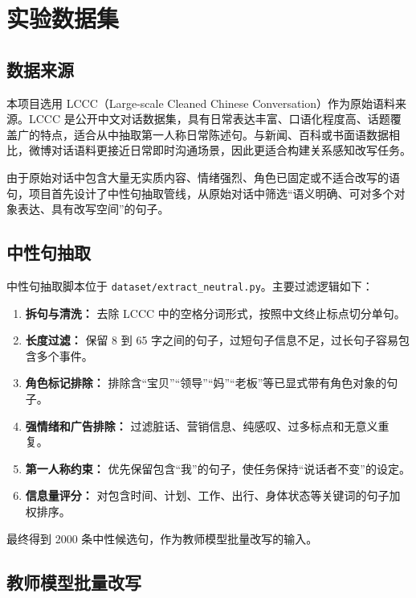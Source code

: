 \documentclass[12pt,a4paper]{ctexart}
\begin{document}
\section{实验数据集}

\subsection{数据来源}

本项目选用 LCCC（Large-scale Cleaned Chinese Conversation）作为原始语料来源。LCCC 是公开中文对话数据集，具有日常表达丰富、口语化程度高、话题覆盖广的特点，适合从中抽取第一人称日常陈述句。与新闻、百科或书面语数据相比，微博对话语料更接近日常即时沟通场景，因此更适合构建关系感知改写任务。

由于原始对话中包含大量无实质内容、情绪强烈、角色已固定或不适合改写的语句，项目首先设计了中性句抽取管线，从原始对话中筛选“语义明确、可对多个对象表达、具有改写空间”的句子。

\subsection{中性句抽取}

中性句抽取脚本位于 \texttt{dataset/extract\_neutral.py}。主要过滤逻辑如下：

\begin{enumerate}[leftmargin=2em]
  \item \textbf{拆句与清洗：} 去除 LCCC 中的空格分词形式，按照中文终止标点切分单句。
  \item \textbf{长度过滤：} 保留 8 到 65 字之间的句子，过短句子信息不足，过长句子容易包含多个事件。
  \item \textbf{角色标记排除：} 排除含“宝贝”“领导”“妈”“老板”等已显式带有角色对象的句子。
  \item \textbf{强情绪和广告排除：} 过滤脏话、营销信息、纯感叹、过多标点和无意义重复。
  \item \textbf{第一人称约束：} 优先保留包含“我”的句子，使任务保持“说话者不变”的设定。
  \item \textbf{信息量评分：} 对包含时间、计划、工作、出行、身体状态等关键词的句子加权排序。
\end{enumerate}

最终得到 2000 条中性候选句，作为教师模型批量改写的输入。

\subsection{教师模型批量改写}
\end{document}
